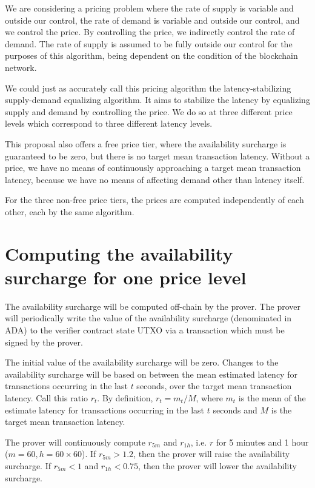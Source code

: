 \documentclass[12pt]{article}
\begin{document}
We are considering a pricing problem where the rate of supply is variable and outside our control, the rate of demand is variable and outside our control, and we control the price. By controlling the price, we indirectly control the rate of demand. The rate of supply is assumed to be fully outside our control for the purposes of this algorithm, being dependent on the condition of the blockchain network.

We could just as accurately call this pricing algorithm the latency-stabilizing supply-demand equalizing algorithm. It aims to stabilize the latency by equalizing supply and demand by controlling the price. We do so at three different price levels which correspond to three different latency levels.

This proposal also offers a free price tier, where the availability surcharge is guaranteed to be zero, but there is no target mean transaction latency. Without a price, we have no means of continuously approaching a target mean transaction latency, because we have no means of affecting demand other than latency itself.

For the three non-free price tiers, the prices are computed independently of each other, each by the same algorithm.

\section{Computing the availability surcharge for one price level}

The availability surcharge will be computed off-chain by the prover. The prover will periodically write the value of the availability surcharge (denominated in ADA) to the verifier contract state UTXO via a transaction which must be signed by the prover.

The initial value of the availability surcharge will be zero. Changes to the availability surcharge will be based on between the mean estimated latency for transactions occurring in the last $t$ seconds, over the target mean transaction latency. Call this ratio $r_t$. By definition, $r_t = m_t / M$, where $m_t$ is the mean of the estimate latency for transactions occurring in the last $t$ seconds and $M$ is the target mean transaction latency.

The prover will continuously compute $r_{5m}$ and $r_{1h}$, i.e. $r$ for 5 minutes and 1 hour ($m = 60, h = 60 \times 60$). If $r_{5m} > 1.2$, then the prover will raise the availability surcharge. If $r_{5m} < 1$ and $r_{1h} < 0.75$, then the prover will lower the availability surcharge.
\end{document}
